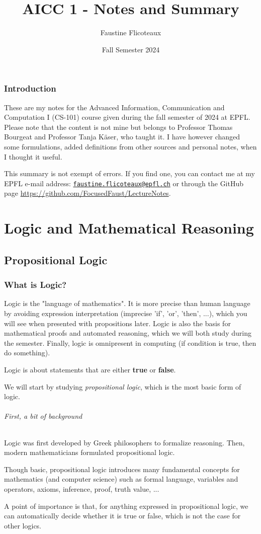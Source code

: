 \documentclass[10pt,a4paper]{book}
\title{AICC 1 - Notes and Summary}
\author{Faustine Flicoteaux}
\date{Fall Semester 2024}
\begin{document}
\maketitle
\tableofcontents
\newpage


\section*{Introduction}
These are my notes for the Advanced Information, Communication and Computation I (CS-101) course given during the fall semester of 2024 at EPFL. Please note that the content is not mine but belongs to Professor Thomas Bourgeat and Professor Tanja Käser, who taught it. I have however changed some formulations, added definitions from other sources and personal notes, when I thought it useful.\par
This summary is not exempt of errors. If you find one, you can contact me at my EPFL e-mail address: \texttt{\href{mailto:faustine.flicoteaux@epfl.ch}{faustine.flicoteaux@epfl.ch}} or through the GitHub page \url{https://github.com/FocusedFaust/LectureNotes}.

\part{Logic and Mathematical Reasoning}

\chapter{Propositional Logic}
\section{What is Logic?}
Logic is the "language of mathematics". It is more precise than human language by avoiding expression interpretation (imprecise 'if', 'or', 'then', ...), which you will see when presented with propositions later. Logic is also the basis for mathematical proofs and automated reasoning, which we will both study during the semester. Finally, logic is omnipresent in computing (if condition is true, then do something).\par 
Logic is about statements that are either \textbf{true} or \textbf{false}. \par 
We will start by studying \textit{propositional logic}, which is the most basic form of logic.
\paragraph{First, a bit of background}
Logic was first developed by Greek philosophers to formalize reasoning. Then, modern mathematicians formulated propositional logic.\par 
Though basic, propositional logic introduces many fundamental concepts for mathematics (and computer science) such as formal language, variables and operators, axioms, inference, proof, truth value, ...\par 
A point of importance is that, for anything expressed in propositional logic, we can automatically decide whether it is true or false, which is not the case for other logics.
\end{document}
